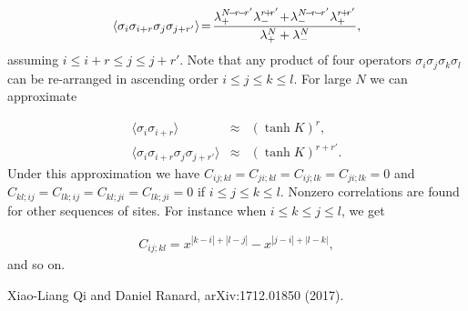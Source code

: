\documentclass[reprint,amsmath,amssymb,aps,showpacs,superscriptaddress,prb]{revtex4-1}
\newcommand{\ba}{\begin{eqnarray}}
\newcommand{\ea}{\end{eqnarray}}
\newcommand{\nn}{\nonumber \\}
\begin{document}
\ba \langle \sigma_i \sigma_{i+r} \sigma_{j} \sigma_{j+r'} \rangle \!= \! { \lambda_+^{N \!- \!r  \!-  \!r'} \lambda_-^{r \!+ \!r'}  \!+ \! \lambda_-^{N \!- \!r \!- \!r'} \lambda_+^{r \!+ \!r'} \over \lambda_+^N + \lambda_-^N} , \ea
assuming $i \le i+r \le j \le j+r'$. Note that any product of four operators $\sigma_i \sigma_j \sigma_k \sigma_l$ can be re-arranged in ascending order $i\le j\le k\le l$. For large $N$ we can approximate

\ba \langle \sigma_i \sigma_{i+r} \rangle &\approx& \left( \tanh K  \right)^{r} , \nn
%
\langle \sigma_i \sigma_{i+r} \sigma_{j} \sigma_{j+r'} \rangle & \approx & \left( \tanh K  \right)^{r+r'} . \ea
Under this approximation we have $C_{ij;kl} = C_{ji; kl} = C_{ij; lk} = C_{ji; lk} = 0$ and $C_{kl; ij} = C_{lk; ij} = C_{kl; ji} = C_{lk; ji} = 0$ if $i\le j \le k \le l$. Nonzero correlations are found for other sequences of sites. For instance when $i \le k \le j \le l$, we get

\ba C_{ij; kl} = x^{|k-i| + |l-j|} - x^{|j-i| + |l-k|} ,  \ea
and so on.



\begin{thebibliography}{99}

 Xiao-Liang Qi and Daniel Ranard, arXiv:1712.01850 (2017).

\end{thebibliography}

%
%
\end{document}
